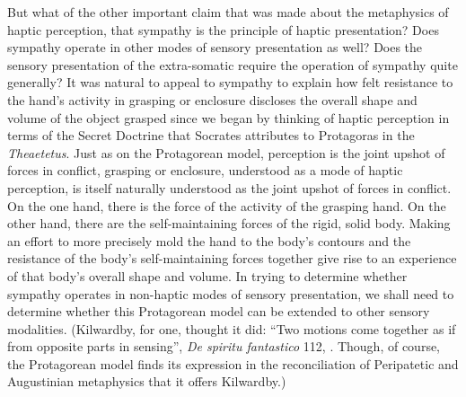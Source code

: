 But what of the other important claim that was made about the metaphysics of haptic perception, that sympathy is the principle of haptic presentation? Does sympathy operate in other modes of sensory presentation as well? Does the sensory presentation of the extra-somatic require the operation of sympathy quite generally? It was natural to appeal to sympathy to explain how felt resistance to the hand's activity in grasping or enclosure discloses the overall shape and volume of the object grasped since we began by thinking of haptic perception in terms of the Secret Doctrine that Socrates attributes to Protagoras in the \emph{Theaetetus}. Just as on the Protagorean model, perception is the joint upshot of forces in conflict, grasping or enclosure, understood as a mode of haptic perception, is itself naturally understood as the joint upshot of forces in conflict. On the one hand, there is the force of the activity of the grasping hand. On the other hand, there are the self-maintaining forces of the rigid, solid body. Making an effort to more precisely mold the hand to the body's contours and the resistance of the body's self-maintaining forces together give rise to an experience of that body's overall shape and volume. In trying to determine whether sympathy operates in non-haptic modes of sensory presentation, we shall need to determine whether this Protagorean model can be extended to other sensory modalities. (Kilwardby, for one, thought it did: ``Two motions come together as if from opposite parts in sensing'', \emph{De spiritu fantastico} 112, \citealt[]{Broadie:1993dz}. Though, of course, the Protagorean model finds its expression in the reconciliation of Peripatetic and Augustinian metaphysics that it offers Kilwardby.)


